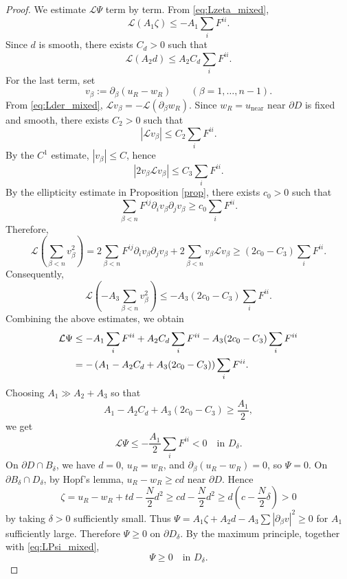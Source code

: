 \documentclass[10pt,a4paper]{amsart}
\begin{document}
\begin{proof}
		We estimate $\mathcal{L}\Psi$ term by term. From \eqref{eq:Lzeta_mixed},
		\[
		\mathcal{L}(A_1\zeta) \le -A_1\sum_i F^{ii}.
		\]
		Since $d$ is smooth, there exists $C_d>0$ such that
		\[
		\mathcal{L}(A_2d) \le A_2 C_d \sum_i F^{ii}.
		\]
		For the last term, set
		\[
		v_\beta:=\partial_\beta(u_R-w_R) \qquad (\beta=1,\dots,n-1).
		\]
		From \eqref{eq:Lder_mixed}, $\mathcal{L}v_\beta = -\mathcal{L}(\partial_\beta w_R)$. 
		Since $w_R=u_{\mathrm{near}}$ near $\partial D$ is fixed and smooth, there exists $C_2>0$ such that
		\[
		|\mathcal{L}v_\beta| \le C_2 \sum_i F^{ii}.
		\]
		By the $C^1$ estimate, $|v_\beta|\le C$, hence
		\[
		|2v_\beta \mathcal{L}v_\beta| \le C_3 \sum_i F^{ii}.
		\]
		By the ellipticity estimate in Proposition \ref{prop}, there exists $c_0>0$ such that
		\[
		\sum_{\beta<n} F^{ij}\partial_i v_\beta \partial_j v_\beta \ge c_0 \sum_i F^{ii}.
		\]
		Therefore,
		\[
		\mathcal{L}\left(\sum_{\beta<n}v_\beta^2\right)
		= 2\sum_{\beta<n}F^{ij}\partial_i v_\beta \partial_j v_\beta
		+ 2\sum_{\beta<n}v_\beta \mathcal{L}v_\beta
		\ge (2c_0 - C_3)\sum_i F^{ii}.
		\]
		Consequently,
		\[
		\mathcal{L}\left(-A_3\sum_{\beta<n}v_\beta^2\right)
		\le -A_3(2c_0 - C_3)\sum_i F^{ii}.
		\]
		Combining the above estimates, we obtain
		\begin{align}
			\mathcal{L}\Psi
			&\le -A_1 \sum_iF^{ii}
			+ A_2C_d\sum_i F^{ii}
			- A_3(2c_0 - C_3)\sum_i F^{ii} \notag \\
			&= -\left(A_1- A_2C_d + A_3(2c_0 - C_3)\right)\sum_i F^{ii}. \label{eq:LPsi_est_mixed}
		\end{align}
		Choosing $A_1\gg A_2+A_3$ so that
		\[
		A_1 - A_2C_d + A_3(2c_0 - C_3) \ge \frac{A_1}{2},
		\]
		we get
		\begin{equation}
			\mathcal{L}\Psi \le -\frac{A_1}{2}\sum_i F^{ii} < 0 \quad \text{in } D_\delta. \label{eq:LPsi_mixed}
		\end{equation}
		On $\partial D\cap B_\delta$, we have $d=0$, $u_R=w_R$, and $\partial_\beta(u_R-w_R)=0$, so $\Psi=0$. 
		On $\partial B_\delta\cap D_\delta$, by Hopf's lemma, $u_R-w_R\ge cd$ near $\partial D$. Hence
		\[
		\zeta = u_R-w_R+td-\frac{N}{2}d^2 \ge cd - \frac{N}{2}d^2 \ge d\left(c-\frac{N}{2}\delta\right)>0
		\]
		by taking $\delta>0$ sufficiently small. Thus $\Psi=A_1\zeta+A_2d-A_3\sum|\partial_\beta v|^2\ge0$ for $A_1$ sufficiently large. 
		Therefore $\Psi\ge0$ on $\partial D_\delta$. By the maximum principle, together with \eqref{eq:LPsi_mixed},
		\begin{equation}
			\Psi \ge 0 \quad \text{in } D_\delta. \label{eq:Psi_bound_mixed}

\end{equation}
\end{proof}
\end{document}
